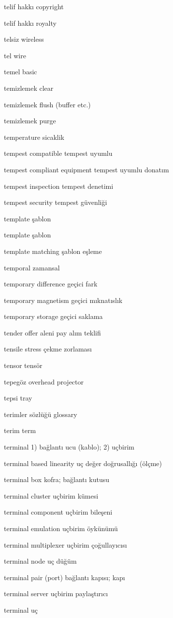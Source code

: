 \documentclass[12pt,fleqn]{article}\usepackage{../../common}
\begin{document}
telif hakkı copyright

telif hakkı royalty

telsiz wireless

tel wire

temel basic

temizlemek clear

temizlemek flush (buffer etc.)

temizlemek purge

temperature sicaklik

tempest compatible tempest uyumlu

tempest compliant equipment tempest uyumlu donatım

tempest inspection tempest denetimi

tempest security tempest güvenliği

template şablon

template şablon

template matching şablon eşleme

temporal zamansal

temporary difference geçici fark

temporary magnetism geçici mıknatıslık

temporary storage geçici saklama

tender offer aleni pay alım teklifi

tensile stress çekme zorlaması

tensor tensör

tepegöz overhead projector

tepsi tray

terimler sözlüğü glossary

terim term

terminal 1) bağlantı ucu (kablo); 2) uçbirim

terminal based linearity uç değer doğrusallığı (ölçme)

terminal box kofra; bağlantı kutusu

terminal cluster uçbirim kümesi

terminal component uçbirim bileşeni

terminal emulation uçbirim öykünümü

terminal multiplexer uçbirim çoğullayıcısı

terminal node uç düğüm

terminal pair (port) bağlantı kapısı; kapı

terminal server uçbirim paylaştırıcı

terminal uç
\end{document}
